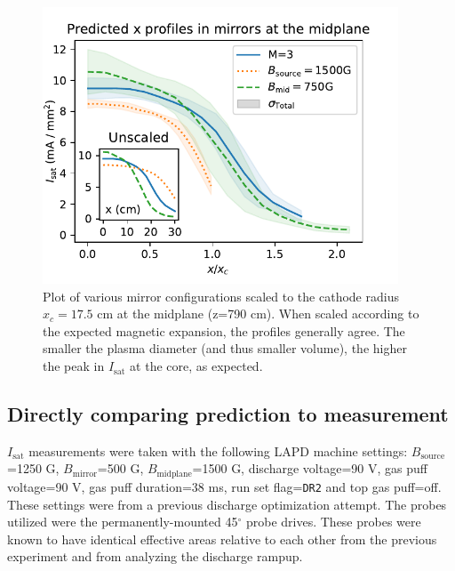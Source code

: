 \begin{figure}
	\centering
	\includegraphics[width=300pt]{figures/changing-B-field_M=3_x-prof.pdf}
	\caption[Mirror configuration predictions scaled to the cathode radius]{\label{fig:changing-B-field_M=3_x-prof}Plot of various mirror configurations scaled to the cathode radius $x_c=17.5$ cm at the midplane (z=790 cm). When scaled according to the expected magnetic expansion, the profiles generally agree. The smaller the plasma diameter (and thus smaller volume), the higher the peak in $I_\text{sat}$ at the core, as expected. }
\end{figure}

\subsection{Directly comparing prediction to measurement}


$I_\text{sat}$ measurements were taken with the following LAPD machine settings: $B_\text{source}$=1250 G, $B_\text{mirror}$=500 G, $B_\text{midplane}$=1500 G, discharge voltage=90 V, gas puff voltage=90 V, gas puff duration=38 ms, run set flag=\texttt{DR2} and top gas puff=off. These settings were from a previous discharge optimization attempt. The probes utilized were the permanently-mounted 45$^\circ$ probe drives. These probes were known to have identical effective areas relative to each other from the previous experiment and from analyzing the discharge rampup.


